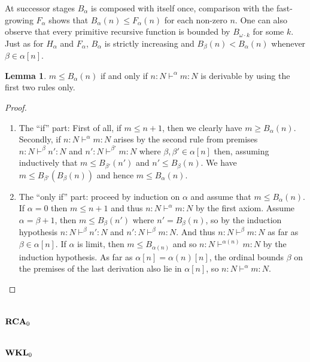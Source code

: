 \documentclass[8pt]{article}
\theoremstyle{definition}
\theoremstyle{definition}
\theoremstyle{definition}
\theoremstyle{definition}
\theoremstyle{definition}
\theoremstyle{definition}
\theoremstyle{definition}
\theoremstyle{definition}
\newtheorem{lemma}{Lemma}[section]
\theoremstyle{definition}
\theoremstyle{definition}
\theoremstyle{definition}
\theoremstyle{definition}
\theoremstyle{definition}
\theoremstyle{question}
\begin{document}
At successor stages $B_{\alpha}$ is composed with itself once, comparison with the fast-growing 
$F_{\alpha}$ shows that $B_{\alpha}(n) \leq F_{\alpha}(n)$ for each non-zero $n$. One can also
observe that every primitive recursive function is bounded by $B_{\omega \cdot k}$ for some $k$.
Just as for $H_{\alpha}$ and $F_{\alpha}$, $B_{\alpha}$ is strictly increasing and 
$B_{\beta}(n) < B_{\alpha}(n)$ whenever $\beta \in \alpha[n]$.

\begin{lemma}
  $m \leq B_{\alpha}(n)$ if and only if $n : N \vdash^{\alpha} m : N$
  is derivable by using the first two rules only.
\end{lemma}

\begin{proof}
  $ $

  \begin{enumerate}
    \item The ``if'' part: First of all, if $m \leq n + 1$, then we clearly have $m \geq B_{\alpha}(n)$.
    Secondly, if $n : N \vdash^{\alpha} m : N$ arises by the second rule from premises $n : N \vdash^{\beta} n' : N$
    and $n' : N \vdash^{\beta'} m : N$ where $\beta, \beta' \in \alpha[n]$ then, assuming inductively
    that $m \leq B_{\beta'}(n')$ and $n' \leq B_{\beta}(n)$. We have $m \leq B_{\beta'}(B_{\beta}(n))$
    and hence $m \leq B_{\alpha}(n)$.
    \item The ``only if'' part: proceed by induction on $\alpha$ and assume that $m \leq B_{\alpha}(n)$.
    If $\alpha = 0$ then $m \leq n + 1$ and thus $n : N \vdash^{\alpha} m : N$ by the first axiom.
    Assume $\alpha = \beta + 1$, then $m \leq B_{\beta}(n')$ where $n' = B_{\beta}(n)$, so by the induction
    hypothesis $n : N \vdash^{\beta} n' : N$ and $n' : N \vdash^{\beta} m : N$. And thus 
    $n : N \vdash^{\beta} m : N$ as far as $\beta \in \alpha[n]$.
    If $\alpha$ is limit, then $m \leq B_{\alpha(n)}$ and so $n : N \vdash^{\alpha(n)} m : N$
    by the induction hypothesis. As far as $\alpha[n] = \alpha(n)[n]$, the ordinal bounds $\beta$
    on the premises of the last derivation also lie in $\alpha[n]$, so $n : N \vdash^{\alpha} m : N$.
  \end{enumerate}
\end{proof}

\section{${\bf RCA}_0$}

\section{${\bf WKL}_0$}
\end{document}
